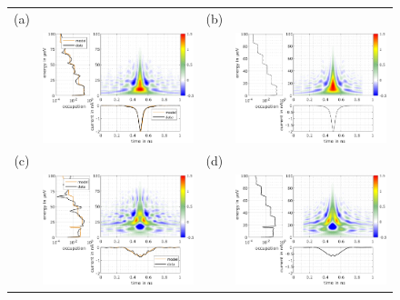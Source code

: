 \begin{figure}[hptb]
	\begin{center}
		\begin{tabular}{c c c c}
			
			(a) & & (b) &  \\ 
			& \includegraphics[width = 6.5 cm]{./chap1/wannierwigData_leviton_20ps_1e_51mK_Projected_Gradient_Method-el-0} &
			& \includegraphics[width = 6.5 cm]{./chap1/wannierwigTheory_leviton_25ps_1e_50mK-el-0} \\
			(c) & & (d) & \\
			& \includegraphics[width = 6.5 cm]{./chap1/wannierwigData_leviton_20ps_1e_51mK_Projected_Gradient_Method-el-1} & &
			\includegraphics[width = 6.5 cm]{./chap1/wannierwigTheory_leviton_25ps_1e_50mK-el-1} \\

\end{tabular}
\end{center}
\end{figure}
